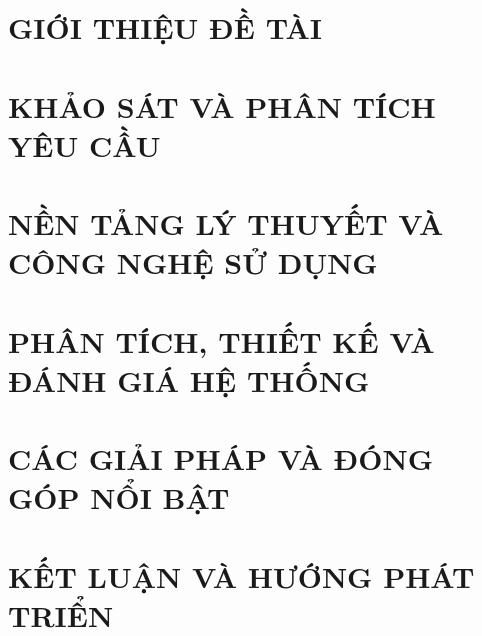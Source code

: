 ﻿\documentclass[a4paper,13pt,3p,oneside]{report}
\theoremstyle{definition}
\begin{document}
\newpage
\begingroup
\renewcommand{\thetable}{\arabic{table}}

\endgroup



\newpage
{}

\pagestyle{fancy}
\fancyhf{}
\fancyhead[L]{\leftmark}
\fancyfoot[R]{\thepage}

\chapter{GIỚI THIỆU ĐỀ TÀI}
\label{chapter:Introduction}

\newpage
\chapter{KHẢO SÁT VÀ PHÂN TÍCH YÊU CẦU}
\label{chapter:Related_works}



\newpage
\chapter{NỀN TẢNG LÝ THUYẾT VÀ CÔNG NGHỆ SỬ DỤNG}
\label{chapter:Methodology}


\newpage
\chapter[PHÂN TÍCH, THIẾT KẾ VÀ ĐÁNH GIÁ HỆ THỐNG]{PHÂN TÍCH, THIẾT KẾ VÀ ĐÁNH GIÁ HỆ THỐNG}
\label{chapter:Experiment}


\newpage
\chapter{CÁC GIẢI PHÁP VÀ ĐÓNG GÓP NỔI BẬT}
\label{chapter:SolutionAndContribution}

\newpage
\chapter{KẾT LUẬN VÀ HƯỚNG PHÁT TRIỂN} %
\label{chapter:conclusion}

\end{document}
